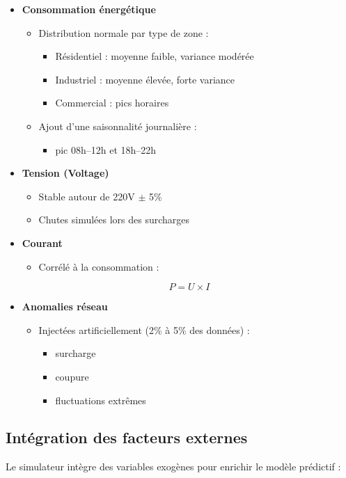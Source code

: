 \documentclass[12pt,a4paper]{report}
\begin{document}
\begin{itemize}
\item \textbf{Consommation énergétique}
\begin{itemize}
\item Distribution normale par type de zone :
\begin{itemize}
\item Résidentiel : moyenne faible, variance modérée
\item Industriel : moyenne élevée, forte variance
\item Commercial : pics horaires
\end{itemize}
\item Ajout d’une saisonnalité journalière :
\begin{itemize}
\item pic 08h–12h et 18h–22h
\end{itemize}
\end{itemize}

\item \textbf{Tension (Voltage)}
\begin{itemize}
\item Stable autour de 220V $\pm$ 5\%
\item Chutes simulées lors des surcharges
\end{itemize}

\item \textbf{Courant}
\begin{itemize}
\item Corrélé à la consommation :
\end{itemize}

\[
P = U \times I
\]

\item \textbf{Anomalies réseau}
\begin{itemize}
\item Injectées artificiellement (2\% à 5\% des données) :
\begin{itemize}
\item surcharge
\item coupure
\item fluctuations extrêmes
\end{itemize}
\end{itemize}
\end{itemize}

\subsection{Intégration des facteurs externes}
Le simulateur intègre des variables exogènes pour enrichir le modèle prédictif :
\end{document}
